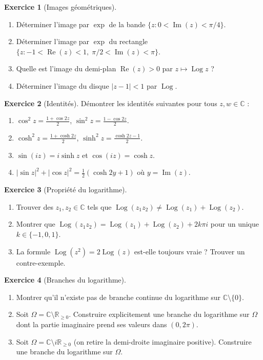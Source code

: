 \documentclass[12pt,a4paper,openany]{book}
\theoremstyle{definition}
\newtheorem{exercice}{Exercice}[chapter]
\theoremstyle{plain}
\theoremstyle{remark}
\newcommand{\C}{\mathbb{C}}
\newcommand{\R}{\mathbb{R}}
\DeclareMathOperator{\re}{Re}
\DeclareMathOperator{\im}{Im}
\DeclareMathOperator{\Log}{Log}
\newcommand{\abs}[1]{\left|#1\right|}
\begin{document}
\begin{exercice}[Images géométriques]\label{exo:images-geometriques}
\begin{enumerate}[label=(\alph*)]
  \item Déterminer l'image par $\exp$ de la bande $\{z : 0 < \im(z) < \pi/4\}$.
  \item Déterminer l'image par $\exp$ du rectangle $\{z : -1 < \re(z) < 1,\; \pi/2 < \im(z) < \pi\}$.
  \item Quelle est l'image du demi-plan $\re(z) > 0$ par $z \mapsto \Log z$ ?
  \item Déterminer l'image du disque $\abs{z-1} < 1$ par $\Log$.
\end{enumerate}
\end{exercice}

\begin{exercice}[Identités]\label{exo:identites}
Démontrer les identités suivantes pour tous $z, w \in \C$ :
\begin{enumerate}[label=(\alph*)]
  \item $\cos^2 z = \frac{1+\cos 2z}{2}$, \quad $\sin^2 z = \frac{1-\cos 2z}{2}$.
  \item $\cosh^2 z = \frac{1+\cosh 2z}{2}$, \quad $\sinh^2 z = \frac{\cosh 2z - 1}{2}$.
  \item $\sin(iz) = i\sinh z$ et $\cos(iz) = \cosh z$.
  \item $\abs{\sin z}^2 + \abs{\cos z}^2 = \frac{1}{2}(\cosh 2y + 1)$ où $y = \im(z)$.
\end{enumerate}
\end{exercice}

\begin{exercice}[Propriété du logarithme]\label{exo:log-propriete}
\begin{enumerate}[label=(\alph*)]
  \item Trouver des $z_1, z_2 \in \C$ tels que $\Log(z_1 z_2) \neq \Log(z_1) + \Log(z_2)$.
  \item Montrer que $\Log(z_1 z_2) = \Log(z_1) + \Log(z_2) + 2k\pi i$ pour un unique $k \in \{-1, 0, 1\}$.
  \item La formule $\Log(z^2) = 2\Log(z)$ est-elle toujours vraie ? Trouver un contre-exemple.
\end{enumerate}
\end{exercice}

\begin{exercice}[Branches du logarithme]\label{exo:branches-log}
\begin{enumerate}[label=(\alph*)]
  \item Montrer qu'il n'existe pas de branche continue du logarithme sur $\C \setminus \{0\}$.
  \item Soit $\Omega = \C \setminus \R_{\geq 0}$. Construire explicitement une branche du logarithme sur $\Omega$ dont la partie imaginaire prend ses valeurs dans $(0, 2\pi)$.
  \item Soit $\Omega = \C \setminus i\R_{\geq 0}$ (on retire la demi-droite imaginaire positive). Construire une branche du logarithme sur $\Omega$.
\end{enumerate}
\end{exercice}
\end{document}
